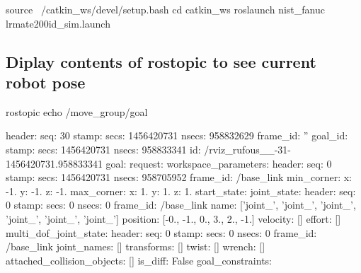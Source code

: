 \begin{DoxyVerb} source ~/catkin_ws/devel/setup.bash
 cd catkin_ws
 roslaunch nist_fanuc lrmate200id_sim.launch
\end{DoxyVerb}


\subsection*{Diplay contents of rostopic to see current robot pose }

rostopic echo /move\-\_\-group/goal

header\-: seq\-: 30 stamp\-: secs\-: 1456420731 nsecs\-: 958832629 frame\-\_\-id\-: '' goal\-\_\-id\-: stamp\-: secs\-: 1456420731 nsecs\-: 958833341 id\-: /rviz\-\_\-rufous\-\_\-\_-\/31-\/1456420731.958833341 goal\-: request\-: workspace\-\_\-parameters\-: header\-: seq\-: 0 stamp\-: secs\-: 1456420731 nsecs\-: 958705952 frame\-\_\-id\-: /base\-\_\-link min\-\_\-corner\-: x\-: -\/1. y\-: -\/1. z\-: -\/1. max\-\_\-corner\-: x\-: 1. y\-: 1. z\-: 1. start\-\_\-state\-: joint\-\_\-state\-: header\-: seq\-: 0 stamp\-: secs\-: 0 nsecs\-: 0 frame\-\_\-id\-: /base\-\_\-link name\-: \mbox{[}'joint\-\_', 'joint\-\_', 'joint\-\_', 'joint\-\_', 'joint\-\_', 'joint\-\_'\mbox{]} position\-: \mbox{[}-\/0., -\/1., 0., 3., 2., -\/1.\mbox{]} velocity\-: \mbox{[}\mbox{]} effort\-: \mbox{[}\mbox{]} multi\-\_\-dof\-\_\-joint\-\_\-state\-: header\-: seq\-: 0 stamp\-: secs\-: 0 nsecs\-: 0 frame\-\_\-id\-: /base\-\_\-link joint\-\_\-names\-: \mbox{[}\mbox{]} transforms\-: \mbox{[}\mbox{]} twist\-: \mbox{[}\mbox{]} wrench\-: \mbox{[}\mbox{]} attached\-\_\-collision\-\_\-objects\-: \mbox{[}\mbox{]} is\-\_\-diff\-: False goal\-\_\-constraints\-:
